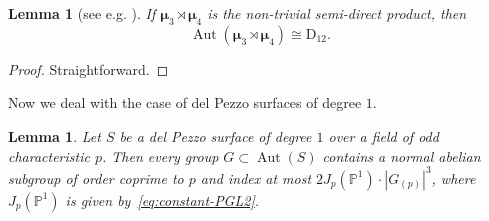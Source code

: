 \documentclass[12pt]{amsart}
\numberwithin{equation}{section}
\newtheorem{lemma}[subsection]{Lemma}
\theoremstyle{definition}
\newcommand{\mumu}{\boldsymbol{\mu}}
\newcommand{\PP}{\mathbb P}
\newcommand{\DD}{\mathrm D}
\DeclareMathOperator{\Aut}{Aut}
\begin{document}
\begin{lemma}[{see e.g. \cite{GroupNames}}]
\label{lemma:Aut-SL23}
If $\mumu_3\rtimes\mumu_4$ is the non-trivial semi-direct product, then
$$
\Aut(\mumu_3\rtimes\mumu_4)\cong\DD_{12}.
$$
\end{lemma}

\begin{proof}
Straightforward.
\end{proof}


Now we deal with the case of del Pezzo surfaces of degree $1$.

\begin{lemma}\label{lemma:dP1}
Let $S$ be a del Pezzo surface of degree $1$ over a field
of odd characteristic $p$.
Then every group $G\subset\Aut(S)$ contains a normal abelian subgroup of order
coprime to $p$ and index at most
$2J_p(\mathbb{P}^1)\cdot |G_{(p)}|^3$, where
$J_p(\PP^1)$ is given by~\eqref{eq:constant-PGL2}.
\end{lemma}
\end{document}
